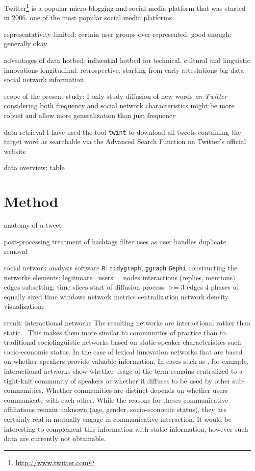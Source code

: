 \documentclass[draft, a4paper, abstract=on]{scrartcl}
\newcommand{\sw}[1]{\texttt{#1}}
\begin{document}
  Twitter\footnote{\url{http://www.twitter.com}} is a popular micro-blogging and social media platform that was started in 2006.
  one of the most popular social media platforms

  representativity
  limited: certain user groups over-represented.
  good enough: generally okay \parencite{Grieve2019MappingLexical}

  advantages of data
  hotbed: influential hotbed for technical, cultural and linguistic innovations
  longitudinal: retrospective, starting from early attestations
  big data
  social network information

  scope of the present study:
  I only study diffusion of new words \emph{on Twitter}
  considering both frequency and social network characteristics might be more robust and allow more generalization than just frequency

  data retrieval
  I have used the tool \sw{twint}
  to download all tweets containing the target word
  as searchable via the Advanced Search Function on Twitter's official website

  data overview: table



\section{Method}

  anatomy of a tweet

  post-processing
    treatment of hashtags
    filter uses as user handles
    duplicate removal

  social network analysis
    software
      \sw{R}: \sw{tidygraph}, \sw{ggraph}
      \sw{Gephi}
    constructing the networks
      elements: legitimate~\parencite{Goel2016SocialDynamics}
      users = nodes
      interactions (replies, mentions) = edges
    subsetting: time slices
      start of diffusion process: >= 3 edges
      4 phases of equally sized time windows
    network metrics
      centralization
      network density
      visualizations

    result: interactional networks
      The resulting networks are interactional rather than static.~\parencite{Goel2016SocialDynamics} This makes them more similar to communities of practice than to traditional sociolinguistic networks based on static speaker characteristics such socio-economic status.
      In the case of lexical innovation networks that are based on whether speakers provide valuable information. In cases such as , for example, interactional networks show whether usage of the term remains centralized to a tight-knit community of speakers or whether it diffuses to be used by other sub-communities.
      Whether communities are distinct depends on whether users communicate with each other. While the reasons for theses communicative affiliations remain unknown (age, gender, socio-economic status), they are certainly real in mutually engage in communicative interaction.
      It would be interesting to complement this information with static information, however such data are currently not obtainable.
\end{document}
